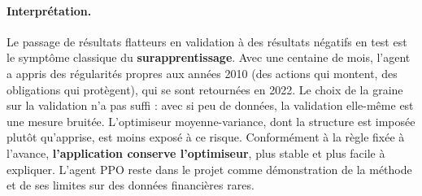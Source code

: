 \paragraph{Interprétation.} Le passage de résultats flatteurs en validation à des résultats négatifs en test est le symptôme classique du \textbf{surapprentissage}. Avec une centaine de mois, l'agent a appris des régularités propres aux années 2010 (des actions qui montent, des obligations qui protègent), qui se sont retournées en 2022. Le choix de la graine sur la validation n'a pas suffi : avec si peu de données, la validation elle-même est une mesure bruitée. L'optimiseur moyenne-variance, dont la structure est imposée plutôt qu'apprise, est moins exposé à ce risque. Conformément à la règle fixée à l'avance, \textbf{l'application conserve l'optimiseur}, plus stable et plus facile à expliquer. L'agent PPO reste dans le projet comme démonstration de la méthode et de ses limites sur des données financières rares.
